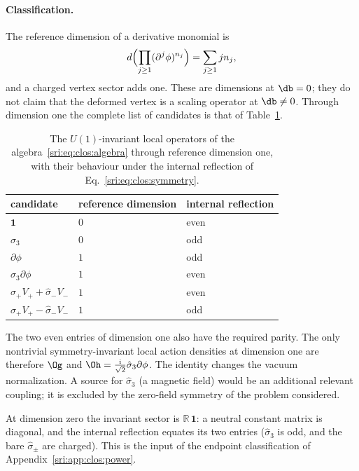 \paragraph{Classification.} The reference dimension of a derivative monomial is
\begin{equation}
 d\Bigl(\prod_{j\ge1}(\partial^j\phi)^{n_j}\Bigr)=\sum_{j\ge1}jn_j,
\end{equation}
and a charged vertex sector adds one. These are dimensions at $\db=0$; they do not claim that the deformed vertex is a
scaling operator at $\db\ne0$. Through dimension one the complete list of candidates is that of
Table~\ref{sri:tab:clos:operators}.
\begin{table}[htbp]\centering\small
\renewcommand{\arraystretch}{1.15}
\begin{tabular}{@{}lll@{}}
\toprule
candidate & reference dimension & internal reflection\\
\midrule
$\mathbf 1$ & $0$ & even\\
$\hat\sigma_3$ & $0$ & odd\\
$\partial\phi$ & $1$ & odd\\
$\hat\sigma_3\partial\phi$ & $1$ & even\\
$\hat\sigma_+V_++\hat\sigma_-V_-$ & $1$ & even\\
$\hat\sigma_+V_+-\hat\sigma_-V_-$ & $1$ & odd\\
\bottomrule
\end{tabular}
\caption{The $U(1)$-invariant local operators of the algebra~\eqref{sri:eq:clos:algebra} through reference dimension one,
with their behaviour under the internal reflection of Eq.~\eqref{sri:eq:clos:symmetry}.}
\label{sri:tab:clos:operators}
\end{table}
The two even entries of dimension one also have the required parity. The only nontrivial symmetry-invariant local
action densities at dimension one are therefore $\Og$ and $\Oh=\frac{\mathrm i}{\sqrt2}\hat\sigma_3\partial\phi$. The
identity changes the vacuum normalization. A source for $\hat\sigma_3$ (a magnetic field) would be an additional
relevant coupling; it is excluded by the zero-field symmetry of the problem considered.

At dimension zero the invariant sector is $\mathbb R\,\mathbf 1$: a neutral constant matrix is diagonal, and the
internal reflection equates its two entries ($\hat\sigma_3$ is odd, and the bare $\hat\sigma_\pm$ are charged). This
is the input of the endpoint classification of Appendix~\ref{sri:app:clos:power}.

